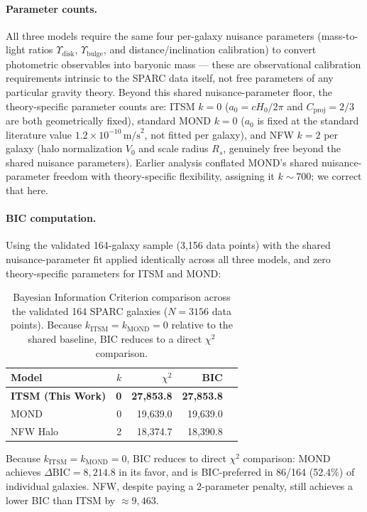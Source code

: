 \documentclass[aps,prd,10pt,twocolumn,superscriptaddress,nofootinbib,floatfix]{revtex4-2}
\begin{document}
\paragraph{Parameter counts.} All three models require the same four per-galaxy nuisance parameters (mass-to-light ratios $\Upsilon_{\text{disk}}$, $\Upsilon_{\text{bulge}}$, and distance/inclination calibration) to convert photometric observables into baryonic mass --- these are observational calibration requirements intrinsic to the SPARC data itself, not free parameters of any particular gravity theory. Beyond this shared nuisance-parameter floor, the theory-specific parameter counts are: ITSM $k=0$ ($a_0=cH_0/2\pi$ and $C_{\text{proj}}=2/3$ are both geometrically fixed), standard MOND $k=0$ ($a_0$ is fixed at the standard literature value $1.2\times10^{-10}\,\text{m/s}^2$, not fitted per galaxy), and NFW $k=2$ per galaxy (halo normalization $V_0$ and scale radius $R_s$, genuinely free beyond the shared nuisance parameters). Earlier analysis conflated MOND's shared nuisance-parameter freedom with theory-specific flexibility, assigning it $k\sim700$; we correct that here.

\paragraph{BIC computation.} Using the validated 164-galaxy sample (3,156 data points) with the shared nuisance-parameter fit applied identically across all three models, and zero theory-specific parameters for ITSM and MOND:

\begin{table}[htbp]
\centering
\caption{\footnotesize Bayesian Information Criterion comparison across the validated 164 SPARC galaxies ($N=3156$ data points). Because $k_{\text{ITSM}}=k_{\text{MOND}}=0$ relative to the shared baseline, BIC reduces to a direct $\chi^2$ comparison.}
\label{tab:bic}
\begin{tabular}{lrrrr}
\toprule
\textbf{Model} & \textbf{$k$} & \textbf{$\chi^2$} & \textbf{BIC} \\
\midrule
\textbf{ITSM (This Work)} & \textbf{0} & \textbf{27,853.8} & \textbf{27,853.8} \\
MOND \cite{mond} & 0 & 19,639.0 & 19,639.0 \\
NFW Halo & 2 & 18,374.7 & 18,390.8 \\
\bottomrule
\end{tabular}
\end{table}

Because $k_{\text{ITSM}}=k_{\text{MOND}}=0$, BIC reduces to direct $\chi^2$ comparison: MOND achieves $\Delta\text{BIC}=8{,}214.8$ in its favor, and is BIC-preferred in 86/164 (52.4\%) of individual galaxies. NFW, despite paying a 2-parameter penalty, still achieves a lower BIC than ITSM by $\approx9{,}463$.
\end{document}
